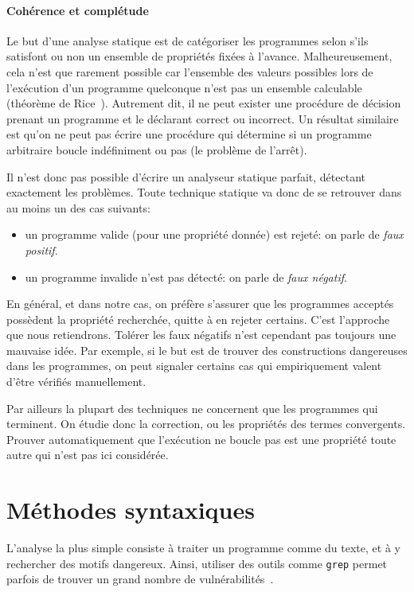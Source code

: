\paragraph{Cohérence et complétude}

Le but d'une analyse statique est de catégoriser les programmes selon s'ils
satisfont ou non un ensemble de propriétés fixées à l'avance. Malheureusement,
cela n'est que rarement possible car l'ensemble des valeurs possibles lors de
l'exécution d'un programme quelconque n'est pas un ensemble calculable (théorème
de Rice~\cite{rice}). Autrement dit, il ne peut exister une procédure de
décision prenant un programme et le déclarant correct ou incorrect. Un résultat
similaire est qu'on ne peut pas écrire une procédure qui détermine si un
programme arbitraire boucle indéfiniment ou pas (le problème de l'arrêt).

Il n'est donc pas possible d'écrire un analyseur statique parfait, détectant
exactement les problèmes. Toute technique statique va donc de se retrouver dans
au moins un des cas suivants:

\begin{itemize}
\item
  un programme valide (pour une propriété donnée) est rejeté: on parle de
  \emph{faux positif}.
\item
  un programme invalide n'est pas détecté: on parle de
  \emph{faux négatif}.
\end{itemize}

En général, et dans notre cas, on préfère s'assurer que les programmes acceptés
possèdent la propriété recherchée, quitte à en rejeter certains. C'est
l'approche que nous retiendrons. Tolérer les faux négatifs n'est cependant pas
toujours une mauvaise idée. Par exemple, si le but est de trouver des
constructions dangereuses dans les programmes, on peut signaler certains cas qui
empiriquement valent d'être vérifiés manuellement.

Par ailleurs la plupart des techniques ne concernent que les programmes qui
terminent. On étudie donc la correction, ou les propriétés des termes
convergents. Prouver automatiquement que l'exécution ne boucle pas est une
propriété toute autre qui n'est pas ici considérée.

\section{Méthodes syntaxiques}

L'analyse la plus simple consiste à traiter un programme comme du texte, et à y
rechercher des motifs dangereux. Ainsi, utiliser des outils comme \texttt{grep}
permet parfois de trouver un grand nombre de vulnérabilités~\cite{SpenderGrep}.

